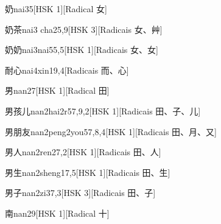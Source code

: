 \begin{entry}{奶}{nai3}{5}[HSK 1][Radical ⼥]
\end{entry}

\begin{entry}{奶茶}{nai3 cha2}{5,9}[HSK 3][Radicais ⼥、⾋]
\end{entry}

\begin{entry}{奶奶}{nai3nai5}{5,5}[HSK 1][Radicais ⼥、⼥]
\end{entry}

\begin{entry}{耐心}{nai4xin1}{9,4}[Radicais ⽽、⼼]
\end{entry}

\begin{entry}{男}{nan2}{7}[HSK 1][Radical ⽥]
\end{entry}

\begin{entry}{男孩儿}{nan2hai2r5}{7,9,2}[HSK 1][Radicais ⽥、⼦、⼉]
\end{entry}

\begin{entry}{男朋友}{nan2peng2you5}{7,8,4}[HSK 1][Radicais ⽥、⽉、⼜]
\end{entry}

\begin{entry}{男人}{nan2ren2}{7,2}[HSK 1][Radicais ⽥、⼈]
\end{entry}

\begin{entry}{男生}{nan2sheng1}{7,5}[HSK 1][Radicais ⽥、⽣]
\end{entry}

\begin{entry}{男子}{nan2zi3}{7,3}[HSK 3][Radicais ⽥、⼦]
\end{entry}

\begin{entry}{南}{nan2}{9}[HSK 1][Radical ⼗]
\end{entry}

